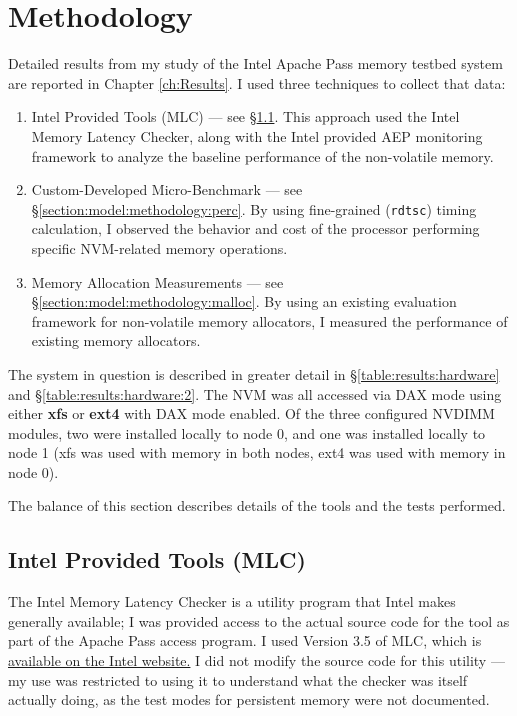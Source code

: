 \section{Methodology}\label{section:model:methodology}

Detailed results from my study of the Intel Apache Pass memory testbed system are reported in 
Chapter \ref{ch:Results}. I used three techniques to collect that data:

\begin{enumerate}
    \item Intel Provided Tools (MLC) --- see \S \ref{section:model:methodology:mlc}.  This approach used the Intel Memory Latency Checker, along with the Intel provided AEP monitoring framework to analyze the baseline performance of the non-volatile memory.
    
    \item Custom-Developed Micro-Benchmark --- see \S \ref{section:model:methodology:perc}.  By using fine-grained (\texttt{rdtsc}) timing calculation, I observed the behavior and cost of the processor performing specific NVM-related memory operations.
    
    \item Memory Allocation Measurements --- see \S \ref{section:model:methodology:malloc}.  By using an existing evaluation framework for non-volatile memory allocators, I measured the performance of existing memory allocators.
\end{enumerate}

The system in question is described in greater detail in \S \ref{table:results:hardware} and \S \ref{table:results:hardware:2}. The NVM was all accessed via \acs{DAX} mode using either \textbf{xfs} or \textbf{ext4} with \acs{DAX} mode enabled.  Of the three configured NVDIMM modules, two were installed locally to node 0, and one was installed locally to node 1 (xfs was used with memory in both nodes, ext4 was used with memory in node 0).


The balance of this section describes details of the tools and the tests performed.

\subsection{Intel Provided Tools (MLC)}\label{section:model:methodology:mlc}

The Intel Memory Latency Checker is a utility program that Intel makes generally available; I was provided access to the actual source code for 
the tool as part of the Apache Pass access program.  I used Version 3.5 of MLC, which is
\href{https://software.intel.com/en-us/articles/intelr-memory-latency-checker}{available on the Intel website.}  I did not modify the source
code for this utility --- my use was restricted to using it to understand what the checker was itself actually doing, as the test modes
for persistent memory were not documented.


